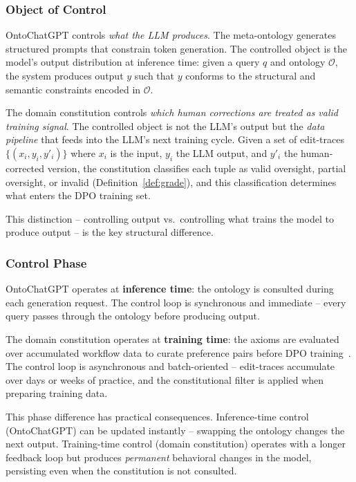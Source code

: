 \documentclass[11pt]{article}
\begin{document}
\subsubsection{Object of Control}

OntoChatGPT controls \emph{what the LLM produces}.
The meta-ontology generates structured prompts that constrain token generation.
The controlled object is the model's output distribution at inference time: given a query $q$ and ontology $\mathcal{O}$, the system produces output $y$ such that $y$ conforms to the structural and semantic constraints encoded in $\mathcal{O}$.

The domain constitution controls \emph{which human corrections are treated as valid training signal}.
The controlled object is not the LLM's output but the \emph{data pipeline} that feeds into the LLM's next training cycle.
Given a set of edit-traces $\{(x_i, y_i, y'_i)\}$ where $x_i$ is the input, $y_i$ the LLM output, and $y'_i$ the human-corrected version, the constitution classifies each tuple as valid oversight, partial oversight, or invalid (Definition~\ref{def:grade}), and this classification determines what enters the DPO training set.

This distinction -- controlling output vs.\ controlling what trains the model to produce output -- is the key structural difference.

\subsubsection{Control Phase}

OntoChatGPT operates at \textbf{inference time}: the ontology is consulted during each generation request.
The control loop is synchronous and immediate -- every query passes through the ontology before producing output.

The domain constitution operates at \textbf{training time}: the axioms are evaluated over accumulated workflow data to curate preference pairs before DPO training~\citep{rafailov2023direct}.
The control loop is asynchronous and batch-oriented -- edit-traces accumulate over days or weeks of practice, and the constitutional filter is applied when preparing training data.

This phase difference has practical consequences.
Inference-time control (OntoChatGPT) can be updated instantly -- swapping the ontology changes the next output.
Training-time control (domain constitution) operates with a longer feedback loop but produces \emph{permanent} behavioral changes in the model, persisting even when the constitution is not consulted.
\end{document}
